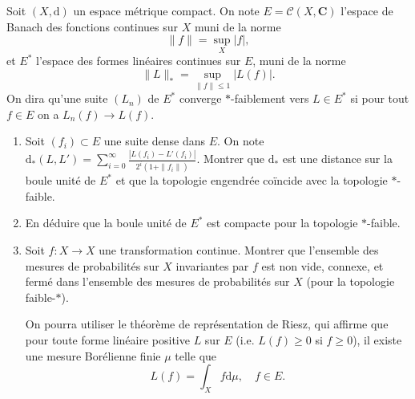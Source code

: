 \documentclass[a4paper,10pt,openany]{article}
\theoremstyle{plain}
\theoremstyle{definition}
\newcommand{\dd}{\mathrm{d}}
\newcommand{\C}{\mathbf{C}}
\begin{document}
 \vspace{1.5mm} 

\noindent Soit $(X, \dd)$ un espace m\'etrique compact. On note $E = \mathcal{C}(X,\C)$ l'espace de Banach des fonctions continues sur $X$ muni de la norme
$$
\| f \| = \sup_{X} |f|,
$$
et $E^*$ l'espace des formes lin\'eaires continues sur $E$, muni de la norme 
$$
\|L\|_* = \sup_{\| f \| \leq 1} |L(f)|. 
$$
On dira qu'une suite $(L_n)$ de $E^*$ converge $*$-faiblement vers $L \in E^*$ si pour tout $f \in E$ on a $L_n(f) \to L(f)$.
\begin{enumerate}
\item Soit $(f_i) \subset E$ une suite dense dans $E$. On note $\displaystyle{\dd_*(L,L') = \sum_{i=0}^\infty \frac{|L(f_i)-L'(f_i)|}{2^i (1+\|f_i\|)}}$. Montrer que $\dd_*$ est une distance sur la boule unit\'e de $E^*$ et que la topologie engendr\'ee co\"incide avec la topologie $*$-faible.
\item En d\'eduire que la boule unit\'e de $E^*$ est compacte pour la topologie $*$-faible.
\item Soit $f : X \to X$ une transformation continue. Montrer que l'ensemble des mesures de probabilit\'es sur $X$ invariantes par $f$ est non vide, connexe, et ferm\'e dans l'ensemble des mesures de probabilit\'es sur $X$ (pour la topologie faible-$*$). 

On pourra utiliser le th\'eor\`eme de repr\'esentation de Riesz, qui affirme que pour toute forme lin\'eaire positive $L$ sur $E$ (i.e. $L(f) \geqslant 0$ si $f \geqslant 0$), il existe une mesure Bor\'elienne finie $\mu$ telle que 
$$
L(f) = \int_X f \dd \mu, \quad f \in E.
$$
\end{enumerate}
\vspace{0.6cm}

 \vspace{1.5mm} 
\end{document}

